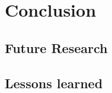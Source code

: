 \chapter{Conclusion}
\blindtext[1]

\section{Future Research}
\blindtext[1]

\section{Lessons learned}
\blindtext[1]